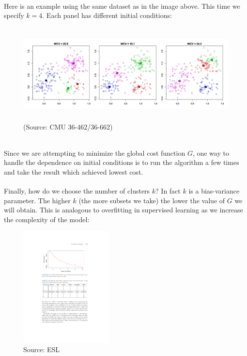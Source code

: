 \documentclass[11pt]{article}
\begin{document}
~\\Here is an example using the same dataset as in the image above. This
        time we specify $k=4$. Each panel has different initial conditions:

  \begin{figure}[H]
      \centering
      \includegraphics[height=2in]{kmeans_iter.jpeg}        
      \caption{(Source: CMU 36-462/36-662)}
    \end{figure}
~\\
Since we are attempting to minimize the global cost function $G$, one
    way to handle the dependence on initial conditions is to run the algorithm a few times and take the result which
    achieved lowest cost.
\\~\\
Finally, how do we choose the number of clusters $k$? In fact $k$ is a
bias-variance parameter. The higher $k$ (the more subsets we take) the lower the
value of $G$ we will obtain. This is analogous to overfitting in supervised
learning as we increase the complexity of the model:
\begin{figure}[H]
      \centering
      \includegraphics[height=2.4in]{kmeans_k_ss.pdf}        
      \caption{Source: ESL}
    \end{figure}
\end{document}
